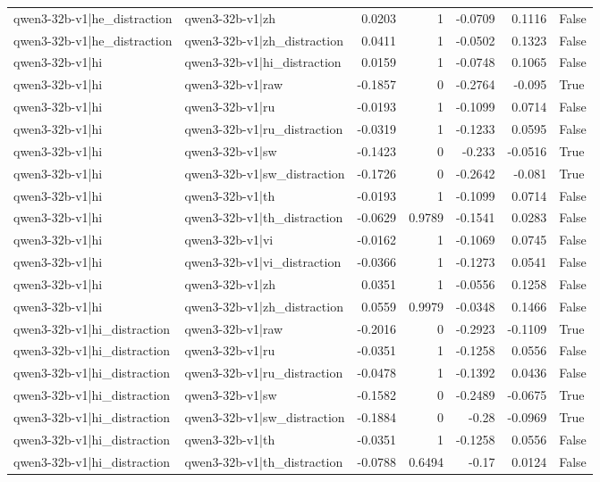 \begin{table}
\begin{tabular}{l l r r r r l}
qwen3-32b-v1|he_distraction & qwen3-32b-v1|zh & 0.0203 & 1 & -0.0709 & 0.1116 & False \\
qwen3-32b-v1|he_distraction & qwen3-32b-v1|zh_distraction & 0.0411 & 1 & -0.0502 & 0.1323 & False \\
qwen3-32b-v1|hi & qwen3-32b-v1|hi_distraction & 0.0159 & 1 & -0.0748 & 0.1065 & False \\
qwen3-32b-v1|hi & qwen3-32b-v1|raw & -0.1857 & 0 & -0.2764 & -0.095 & True \\
qwen3-32b-v1|hi & qwen3-32b-v1|ru & -0.0193 & 1 & -0.1099 & 0.0714 & False \\
qwen3-32b-v1|hi & qwen3-32b-v1|ru_distraction & -0.0319 & 1 & -0.1233 & 0.0595 & False \\
qwen3-32b-v1|hi & qwen3-32b-v1|sw & -0.1423 & 0 & -0.233 & -0.0516 & True \\
qwen3-32b-v1|hi & qwen3-32b-v1|sw_distraction & -0.1726 & 0 & -0.2642 & -0.081 & True \\
qwen3-32b-v1|hi & qwen3-32b-v1|th & -0.0193 & 1 & -0.1099 & 0.0714 & False \\
qwen3-32b-v1|hi & qwen3-32b-v1|th_distraction & -0.0629 & 0.9789 & -0.1541 & 0.0283 & False \\
qwen3-32b-v1|hi & qwen3-32b-v1|vi & -0.0162 & 1 & -0.1069 & 0.0745 & False \\
qwen3-32b-v1|hi & qwen3-32b-v1|vi_distraction & -0.0366 & 1 & -0.1273 & 0.0541 & False \\
qwen3-32b-v1|hi & qwen3-32b-v1|zh & 0.0351 & 1 & -0.0556 & 0.1258 & False \\
qwen3-32b-v1|hi & qwen3-32b-v1|zh_distraction & 0.0559 & 0.9979 & -0.0348 & 0.1466 & False \\
qwen3-32b-v1|hi_distraction & qwen3-32b-v1|raw & -0.2016 & 0 & -0.2923 & -0.1109 & True \\
qwen3-32b-v1|hi_distraction & qwen3-32b-v1|ru & -0.0351 & 1 & -0.1258 & 0.0556 & False \\
qwen3-32b-v1|hi_distraction & qwen3-32b-v1|ru_distraction & -0.0478 & 1 & -0.1392 & 0.0436 & False \\
qwen3-32b-v1|hi_distraction & qwen3-32b-v1|sw & -0.1582 & 0 & -0.2489 & -0.0675 & True \\
qwen3-32b-v1|hi_distraction & qwen3-32b-v1|sw_distraction & -0.1884 & 0 & -0.28 & -0.0969 & True \\
qwen3-32b-v1|hi_distraction & qwen3-32b-v1|th & -0.0351 & 1 & -0.1258 & 0.0556 & False \\
qwen3-32b-v1|hi_distraction & qwen3-32b-v1|th_distraction & -0.0788 & 0.6494 & -0.17 & 0.0124 & False \\

\end{tabular}
\end{table}
